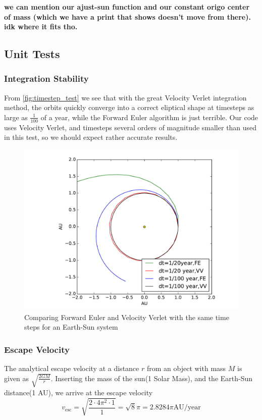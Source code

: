 \documentclass[a4paper]{article}
\begin{document}
\textbf{we can mention our ajust-sun function and our constant origo center of mass (which we have a print that shows doesn't move from there). idk where it fits tho.}

\subsection{Unit Tests}
\subsubsection{Integration Stability}
From \vref{fig:timestep_test} we see that with the great Velocity Verlet integration method, the orbits quickly converge into a correct eliptical shape at timesteps as large as $\frac{1}{100}$ of a year, while the Forward Euler algorithm is just terrible. Our code uses Velocity Verlet, and timesteps several orders of magnitude smaller than used in this test, so we should expect rather accurate results.\\


\begin{figure}[ht]
\includegraphics[width=\textwidth]{fig/timestep_test.pdf}
\caption{Comparing Forward Euler and Velocity Verlet with the same time steps for an Earth-Sun system}
\label{fig:timestep_test}
\end{figure}


\subsubsection{Escape Velocity}
The analytical escape velocity at a distance $r$ from an object with mass $M$ is given as $\sqrt{\frac{2GM}{r}}$. Inserting the mass of the sun(1 Solar Mass), and the Earth-Sun distance(1 AU), we arrive at the escape velocity
\begin{equation}
v_{\mathrm{esc}} = \sqrt{\frac{2\cdot 4\pi^2 \cdot 1}{1}} = \sqrt{8}\pi = 2.8284\pi \mathrm{AU}/\mathrm{year} \label{eq:escape_velocity}
\end{equation}
\end{document}
